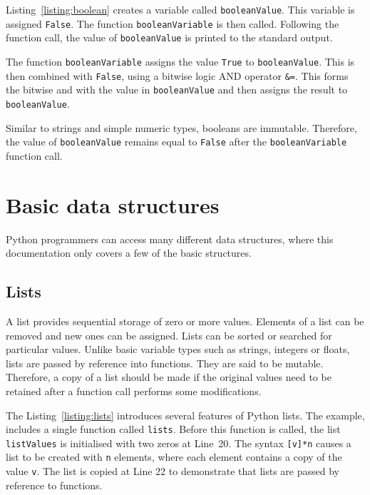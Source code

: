 \documentclass[11pt,a4paper]{article}
\begin{document}


Listing~\ref{listing:boolean} creates a variable called \texttt{booleanValue}.  This variable is assigned \texttt{False}.  The function \texttt{booleanVariable} is then called.  Following the function call, the value of \texttt{booleanValue} is printed to the standard output.

The function \texttt{booleanVariable} assigns the value \texttt{True} to \texttt{booleanValue}.  This is then combined with \texttt{False}, using a bitwise logic AND operator \texttt{\&=}.  This forms the bitwise and with the value in \texttt{booleanValue} and then assigns the result to \texttt{booleanValue}.

Similar to strings and simple numeric types, booleans are immutable.  Therefore, the value of \texttt{booleanValue} remains equal to \texttt{False} after the \texttt{booleanVariable} function call.

\section{Basic data structures}

Python programmers can access many different data structures, where this documentation only covers a few of the basic structures.

\subsection{Lists \label{section:lists}}

A list provides sequential storage of zero or more values.  Elements of a list can be removed and new ones can be assigned.  Lists can be sorted or searched for particular values.  Unlike basic variable types such as strings, integers or floats, lists are passed by reference into functions.  They are said to be mutable.  Therefore, a copy of a list should be made if the original values need to be retained after a function call performs some modifications.

The Listing~\ref{listing:lists} introduces several features of Python lists.  The example, includes a single function called \texttt{lists}.  Before this function is called, the list \texttt{listValues} is initialised with two zeros at Line~20.  The syntax \texttt{[v]*n} causes a list to be created with \texttt{n} elements, where each element contains a copy of the value \texttt{v}.  The list is copied at Line 22 to demonstrate that lists are passed by reference to functions.
\end{document}

